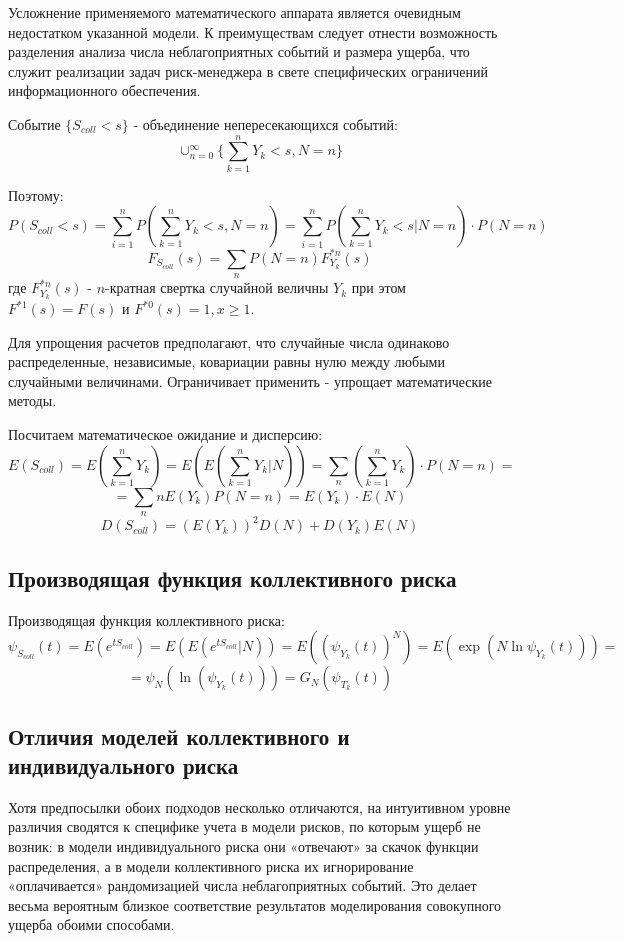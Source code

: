 \documentclass[%
12pt, %
final, %
oneside, %
onecolumn, %
centertags]{article} %
\theoremstyle{plain}
\theoremstyle{definition}
\theoremstyle{remark}
\begin{document}
Усложнение применяемого математического аппарата является очевидным
недостатком указанной модели. К преимуществам следует отнести возможность разделения анализа числа неблагоприятных событий и размера ущерба, что служит реализации задач риск-менеджера в свете специфических ограничений информационного обеспечения.

Событие $\{S_{coll} < s\}$ - объединение непересекающихся событий:
$$\cup_{n=0}^{\infty} \{\sum\limits_{k=1}^n Y_k < s, N = n\}$$

Поэтому:
$$P(S_{coll} < s) = \sum\limits_{i=1}^n P(\sum\limits_{k=1}^n Y_k < s, N = n) = \sum\limits_{i=1}^n P(\sum\limits_{k=1}^n Y_k < s \vert N = n) \cdot P(N = n)$$
$$F_{S_{coll}}(s) = \sum\limits_{n} P(N=n)F_{Y_k}^{*n}(s)$$
где $F_{Y_k}^{*n}(s)$ - $n$-кратная свертка случайной величны $Y_k$ при этом $F^{*1}(s) = F(s)$ и $F^{*0}(s) = 1, x \geqslant 1$.

Для упрощения расчетов предполагают, что случайные числа одинаково распределенные, независимые, ковариации равны нулю между любыми случайными величинами. Ограничивает применить - упрощает математические методы.

Посчитаем математическое ожидание и дисперсию:
$$E(S_{coll}) = E(\sum\limits_{k=1}^n Y_k) = E(E(\sum\limits_{k=1}^n Y_k \vert N)) = \sum\limits_n \left(\sum\limits_{k=1}^n Y_k\right) \cdot P(N = n) = $$
$$=\sum\limits_n n E(Y_k)P(N=n) = E(Y_k) \cdot E(N)$$
$$D(S_{coll}) = (E(Y_k))^2D(N) + D(Y_k)E(N)$$

\subsection{Производящая функция коллективного риска}

Производящая функция коллективного риска:
$$\psi_{S_{coll}}(t) = E(e^{tS_{coll}}) = E(E(e^{tS_{coll}}\vert N)) = E((\psi_{Y_k}(t))^N) = E(\exp (N \ln \psi_{Y_k}(t))) = $$
$$ = \psi_N(\ln (\psi_{Y_k}(t))) = G_N(\psi_{T_k}(t))$$

\subsection{Отличия моделей коллективного и индивидуального риска}

Хотя предпосылки обоих подходов несколько отличаются, на интуитивном
уровне различия сводятся к специфике учета в модели рисков, по которым ущерб не
возник: в модели индивидуального риска они «отвечают» за скачок функции распределения, а в модели коллективного риска их игнорирование «оплачивается» рандомизацией числа неблагоприятных событий. Это делает весьма вероятным близкое
соответствие результатов моделирования совокупного ущерба обоими способами.
\end{document}
